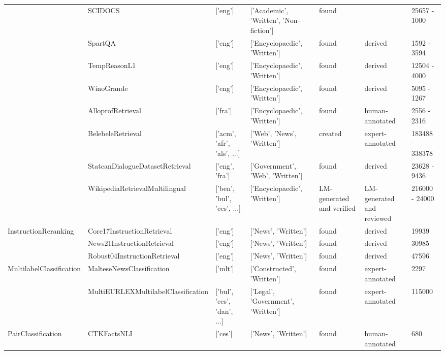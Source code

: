\begin{table*}
{\begin{tabular}{lllllll}
     & SCIDOCS \cite{specter2020cohan} & ['eng'] & ['Academic', 'Written', 'Non-fiction'] & found & & 25657 - 1000 \\
     & SpartQA \cite{xiao2024rar} & ['eng'] & ['Encyclopaedic', 'Written'] & found & derived & 1592 - 3594 \\
     & TempReasonL1 \cite{xiao2024rar} & ['eng'] & ['Encyclopaedic', 'Written'] & found & derived & 12504 - 4000 \\
     & WinoGrande \cite{xiao2024rar} & ['eng'] & ['Encyclopaedic', 'Written'] & found & derived & 5095 - 1267 \\
     & AlloprofRetrieval \cite{lef23} & ['fra'] & ['Encyclopaedic', 'Written'] & found & human-annotated & 2556 - 2316 \\
     & BelebeleRetrieval \cite{bandarkar2023belebele} & ['acm', 'afr', 'als', ...] & ['Web', 'News', 'Written'] & created & expert-annotated & 183488 - 338378 \\
     & StatcanDialogueDatasetRetrieval \cite{lu-etal-2023-statcan} & ['eng', 'fra'] & ['Government', 'Web', 'Written'] & found & derived & 23628 - 9436 \\
     & WikipediaRetrievalMultilingual  & ['ben', 'bul', 'ces', ...] & ['Encyclopaedic', 'Written'] & LM-generated and verified & LM-generated and reviewed & 216000 - 24000 \\
    \cline{1-7}
    \multirow[t]{3}{*}{InstructionReranking} & Core17InstructionRetrieval \cite{weller2024followir} & ['eng'] & ['News', 'Written'] & found & derived & 19939 \\
     & News21InstructionRetrieval \cite{weller2024followir} & ['eng'] & ['News', 'Written'] & found & derived & 30985 \\
     & Robust04InstructionRetrieval \cite{weller2024followir} & ['eng'] & ['News', 'Written'] & found & derived & 47596 \\
    \cline{1-7}
    \multirow[t]{2}{*}{MultilabelClassification} & MalteseNewsClassification \cite{maltese-news-datasets} & ['mlt'] & ['Constructed', 'Written'] & found & expert-annotated & 2297 \\
     & MultiEURLEXMultilabelClassification \cite{chalkidis-etal-2021-multieurlex} & ['bul', 'ces', 'dan', ...] & ['Legal', 'Government', 'Written'] & found & expert-annotated & 115000 \\
    \cline{1-7}
    \multirow[t]{6}{*}{PairClassification} & CTKFactsNLI \cite{ullrich2023csfever} & ['ces'] & ['News', 'Written'] & found & human-annotated & 680 \\

\end{tabular}}
\end{table*}
